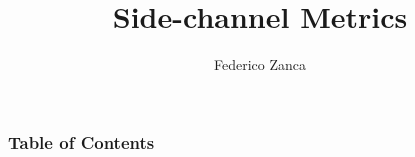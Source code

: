 \documentclass{beamer}
\title[Power Analysis Side-channel Attacks] %
{Side-channel Metrics}
\subtitle{}
\author[Federico Zanca] %
{Federico Zanca}
\institute[] %
{
  Computer Science and Engineering\\
  Politecnico di Milano
}
\date[2025] %
{}
\begin{document}
\frame{\titlepage}


\begin{frame}
\frametitle{Table of Contents}
\tableofcontents
\end{frame}





\end{document}
